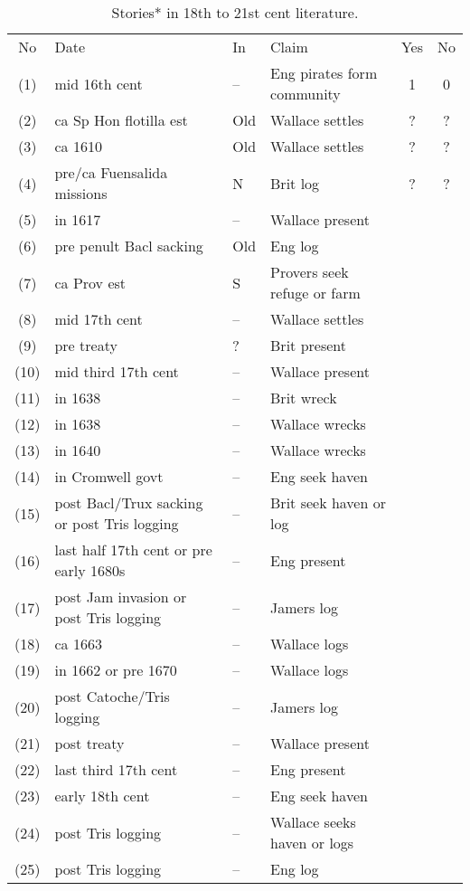 \begin{table}%
\caption{Stories* in 18th to 21st cent literature.}
\label{pptablit}
\begin{sideways}
\begin{tabular}{cp{.4\textheight}lp{.3\textheight}cc}
No	&Date	&In	&Claim	&Yes	&No\\
(1)	&mid 16th cent	&--	&Eng pirates form community	&1	&0\\%
(2)	&ca Sp Hon flotilla est	&Old	&Wallace settles	&?	&?\\%
(3)	&ca 1610	&Old&Wallace settles	&?	&?\\%
(4)	&pre/ca Fuensalida missions	&N	&Brit log	&?	&?\\%
(5)	&in 1617	&--	&Wallace present&&\\%
(6)	&pre penult Bacl sacking	&Old	&Eng log	&&\\%
(7)	&ca Prov est	&S	&Provers seek refuge or farm	&&\\%
(8)	&mid 17th cent	&--	&Wallace settles	&&\\%
(9)	&pre treaty	&?	&Brit present	&&\\%
(10)	&mid third 17th cent	&--	&Wallace present	&&\\%
(11)	&in 1638	&--	&Brit wreck	&&\\%
(12)	&in 1638	&--	&Wallace wrecks	&&\\%
(13)	&in 1640	&--	&Wallace wrecks	&&\\%
(14)	&in Cromwell govt	&--	&Eng seek haven	&&\\%
(15)	&post Bacl/Trux sacking or post Tris logging	&--	&Brit seek haven or log	&&\\%
(16)	&last half 17th cent or pre early 1680s	&--	&Eng present	&&\\%
(17)	&post Jam invasion or post Tris logging	&--	&Jamers log	&&\\%
(18)	&ca 1663	&--	&Wallace logs	&&\\%
(19)	&in 1662	 or pre 1670&--	&Wallace logs	&&\\%
(20)	&post Catoche/Tris logging	&--	&Jamers log	&&\\%
(21)	&post treaty	&--	&Wallace present	&&\\%
(22)	&last third 17th cent	&--	&Eng present	&&\\%
(23)	&early 18th cent	&--	&Eng seek haven	&&\\%
(24)	&post Tris logging	&--	&Wallace seeks haven or logs	&&\\%
(25)	&post Tris logging	&--	&Eng log	&&%
\end{tabular}
\end{sideways}
\end{table}
%
